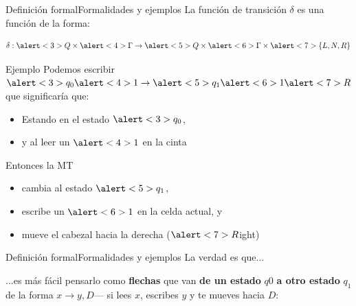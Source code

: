 \documentclass[spanish, handout]{beamer}
\begin{document}
\begin{frame}{Definición formal}{Formalidades y ejemplos}
    La función de transición $\delta$ es una función de la forma:
    
    $$\delta : \alert<3>{Q} \times \alert<4>{\Gamma} \to \alert<5>{Q} \times \alert<6>{\Gamma} \times \alert<7>{\{L,N,R\}}$$ \pause

    \begin{exampleblock}{Ejemplo}
        Podemos escribir $\alert<3>{q_0} \alert<4>{1} \to \alert<5>{q_1} \alert<6>{1} \alert<7>{R}$ que significaría que: \pause

        \begin{itemize}
            \item Estando en el estado $\alert<3>{q_0}$, \pause
            \item y al leer un $\alert<4>{1}$ en la cinta \pause
        \end{itemize}
        Entonces la MT
        \begin{itemize}
            \item cambia al estado $\alert<5>{q_1}$, \pause
            \item escribe un $\alert<6>{1}$ en la celda actual, y \pause
            \item mueve el cabezal hacia la derecha ($\alert<7>{R}$ight)
        \end{itemize}
        
    \end{exampleblock}
    
\end{frame}

\begin{frame}{Definición formal}{Formalidades y ejemplos}
    La verdad es que... \pause

    \bigskip
    
    ...es más fácil pensarlo como \textbf{flechas} que van \textbf{de un estado} $q0$ \textbf{a otro estado} $q_1$ de la forma $x \to y, D$--- si \alert{lees $x$}, \alert{escribes $y$} y te \alert{mueves hacia $D$}: \pause

    \bigskip

    \begin{center}
    \end{center}
\end{frame}
\end{document}
